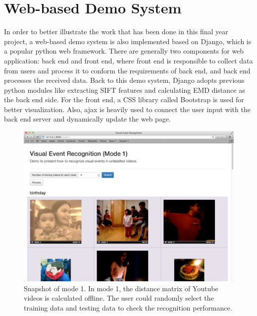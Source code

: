 \section{Web-based Demo System}
In order to better illustrate the work that has been done in this final year project, a web-based demo system is also implemented based on Django, which is a popular python web framework. There are generally two components for web application: back end and front end, where front end is responsible to collect data from users and process it to conform the requirements of back end, and back end processes the received data. Back to this demo system, Django adopts previous python modules like extracting SIFT features and calculating EMD distance as the back end side. For the front end, a CSS library called Bootstrap is used for better visualization. Also, ajax is heavily used to connect the user input with the back end server and dynamically update the web page. \\

\begin{figure}[!ht]
\centering
	\includegraphics[scale=0.2]{./mode1.png}
\caption{Snapshot of mode 1. In mode 1, the distance matrix of Youtube videos is calculated offline. The user could randomly select the training data and testing data to check the recognition performance.}
\end{figure}

